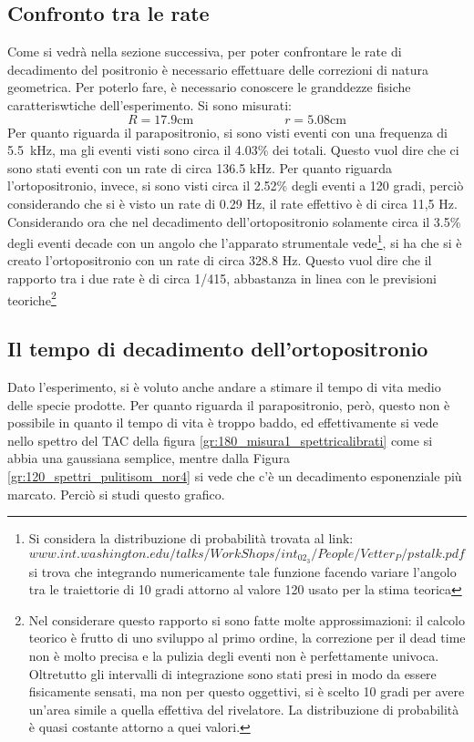 \subsection{Confronto tra le rate}
Come si vedrà nella sezione successiva, per poter confrontare le rate di decadimento del positronio è necessario effettuare delle correzioni di natura geometrica. Per poterlo
fare, è necessario conoscere le granddezze fisiche caratteriswtiche dell'esperimento. Si sono misurati:
$$R = 17.9 \text{cm} \hspace{3cm} r =5.08 \text{cm}$$
Per quanto riguarda il parapositronio, si sono visti eventi con una frequenza di 5.5~kHz, ma gli eventi visti sono circa il 4.03\% dei totali. Questo vuol dire che 
ci sono stati eventi con un rate di circa 136.5 kHz. Per quanto riguarda l'ortopositronio, invece, si sono visti circa il 2.52\% degli eventi a 120 gradi,
perciò considerando che si è visto un rate
di 0.29 Hz, il rate effettivo è di circa 11,5 Hz. Considerando ora che nel decadimento dell'ortopositronio solamente circa il 3.5\% degli eventi decade con un
angolo che l'apparato strumentale vede\footnote{Si considera la distribuzione di probabilità trovata al link:
$www.int.washington.edu/talks/WorkShops/int_02_3/People/Vetter_P/pstalk.pdf$
si trova che integrando numericamente tale funzione facendo variare l'angolo tra le traiettorie di 10 gradi attorno al valore 120 usato per la stima teorica},
si ha che si è creato l'ortopositronio con un rate di circa 328.8 Hz. Questo vuol dire che il rapporto tra i due rate è di circa 1/415, abbastanza in linea con le previsioni
teoriche\footnote{Nel considerare questo rapporto si sono fatte molte approssimazioni: il calcolo teorico è frutto di uno sviluppo al primo ordine, la correzione per il
dead time non è molto precisa e la pulizia degli eventi non è perfettamente univoca. Oltretutto gli intervalli di integrazione sono stati presi in modo da essere fisicamente
sensati, ma non per questo oggettivi, si è scelto 10 gradi per avere un'area simile a quella effettiva del rivelatore. La distribuzione di probabilità è quasi costante
attorno a quei valori.}

\FloatBarrier
\subsection{Il tempo di decadimento dell'ortopositronio}
Dato l'esperimento, si è voluto anche andare a stimare il tempo di vita medio delle specie prodotte. Per quanto riguarda il parapositronio, però, questo non è
possibile in quanto il tempo di vita è troppo baddo, ed effettivamente si vede nello spettro del TAC della figura \ref{gr:180_misura1_spettricalibrati} come si
abbia una gaussiana semplice, mentre dalla Figura \ref{gr:120_spettri_pulitisom_nor4} si vede che c'è un decadimento esponenziale più marcato. Perciò si studi questo
grafico.\\

